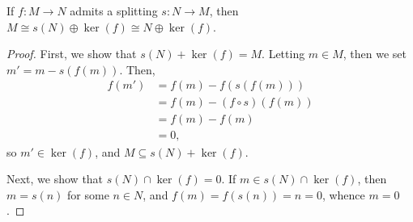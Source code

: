 \documentclass[10pt]{mypackage}
\begin{document}
\begin{lemma}
  If $f\colon M\rightarrow N$ admits a splitting $s\colon N\rightarrow M$, then $M\cong s(N)\oplus \ker\left( f \right)\cong N\oplus \ker\left( f \right)$.
\end{lemma}
\begin{proof}
  First, we show that $s(N) + \ker(f) = M$. Letting $m\in M$, then we set $m' = m - s(f(m))$. Then,
  \begin{align*}
    f\left( m' \right) &= f(m) - f\left( s\left( f(m) \right) \right)\\
                       &= f(m) - \left( f\circ s \right)\left( f(m) \right)\\
                       &= f(m) - f(m)\\
                       &= 0,
  \end{align*}
  so $m'\in \ker\left( f \right)$, and $M\subseteq s(N) + \ker\left( f \right)$.%

  Next, we show that $s(N)\cap \ker\left( f \right) = 0$. If $m\in s(N)\cap \ker\left( f \right)$, then $m = s(n)$ for some $n\in N$, and $f(m) = f(s(n)) = n = 0$, whence $m = 0$.
\end{proof}
\end{document}
